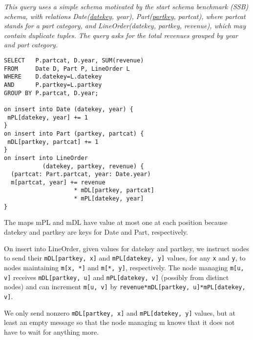 \begin{example}\em
\label{ex:ssb}
This query uses a simple schema motivated by the start schema
benchmark (SSB) schema, with relations Date(\underline{datekey}, year),
Part(\underline{partkey}, partcat), where partcat stands for a part category,
and LineOrder(datekey, partkey, revenue), which may contain duplicate tuples.
The query asks for the total revenues grouped by year and part category.

\begin{verbatim}
SELECT   P.partcat, D.year, SUM(revenue)
FROM     Date D, Part P, LineOrder L
WHERE    D.datekey=L.datekey
AND      P.partkey=L.partkey
GROUP BY P.partcat, D.year;

on insert into Date (datekey, year) {
 mPL[datekey, year] += 1
}
on insert into Part (partkey, partcat) {
 mDL[partkey, partcat] += 1
}
on insert into LineOrder
           (datekey, partkey, revenue) {
  (partcat: Part.partcat, year: Date.year)
  m[partcat, year] += revenue
                    * mDL[partkey, partcat]
                    * mPL[datekey, year]
}
\end{verbatim}

The maps mPL and mDL have value at most
one at each position because datekey and partkey are keys for Date and Part,
respectively.

On insert into LineOrder, given values for
datekey and partkey, we instruct nodes
to send their {\tt mDL[partkey, x]} and {\tt mPL[datekey, y]} values,
for any {\tt x} and {\tt y},
to nodes maintaining {\tt m[x, *]} and {\tt m[*, y]}, respectively.
The node managing
{\tt m[u, v]} receives {\tt mDL[partkey, u]} and {\tt mPL[datekey, v]}
(possibly from distinct nodes) and can
increment {\tt m[u, v]} by
{\tt revenue*mDL[partkey, u]*mPL[datekey, v]}.
\punto
\end{example}


We only send nonzero {\tt mDL[partkey, x]} and {\tt mPL[datekey, y]} values,
but at least an empty message so that the node managing m knows that it does
not have to wait for anything more.


